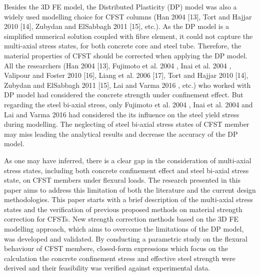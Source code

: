 \documentclass[12pt, A4]{article}
\begin{document}
	\par
	Besides the 3D FE model, the Distributed Plasticity (DP) model was also a widely used modelling choice for CFST columns (Han 2004 [13], Tort and Hajjar 2010 [14], Zubydan and ElSabbagh 2011 [15], etc.). As the DP model is a simplified numerical solution coupled with fibre element, it could not capture the multi-axial stress states, for both concrete core and steel tube. Therefore, the material properties of CFST should be corrected when applying the DP model. All the researchers (Han 2004 [13], Fujimoto et al. 2004 \cite{RN15}, Inai et al. 2004 \cite{RN30}, Valipour and Foster 2010 [16], Liang et al. 2006 [17], Tort and Hajjar 2010 [14], Zubydan and ElSabbagh 2011 [15], Lai and Varma 2016 \cite{RN32}, etc.) who worked with DP model had considered the concrete strength under confinement effect. But regarding the steel bi-axial stress, only Fujimoto et al. 2004 \cite{RN15}, Inai et al. 2004 \cite{RN30} and Lai and Varma 2016 \cite{RN32} had considered the its influence on the steel yield stress during modelling. The neglecting of steel bi-axial stress states of CFST member may miss leading the analytical results and decrease the accuracy of the DP model.
	\par
	As one may have inferred, there is a clear gap in the consideration of multi-axial stress states, including both concrete confinement effect and steel bi-axial stress state, on CFST members under flexural loads. The research presented in this paper aims to address this limitation of both the literature and the current design methodologies. This paper starts with a brief description of the multi-axial stress states and the verification of previous proposed methods on material strength correction for CFSTs. New strength correction methods based on the 3D FE modelling approach, which aims to overcome the limitations of the DP model, was developed and validated. By conducting a parametric study on the flexural behaviour of CFST members, closed-form expressions which focus on the calculation the concrete confinement stress and effective steel strength were derived and their feasibility was verified against experimental data. 
	
	
	
	
	
\end{document}
